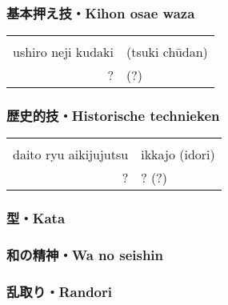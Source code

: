 \subsubsection{基本押え技・Kihon osae waza}
\begin{table}[H]
\begin{center}
\begin{tabular}{rl}
    \ruby{}{}\ruby{}{} & \\
    ushiro neji kudaki & (tsuki ch\={u}dan)\\
    ? & (?)
\end{tabular}
\end{center}
\label{kyuu_3_kihon_osae_waza}
\end{table}

\subsubsection{歴史的技・Historische technieken}
\begin{table}[H]
\begin{center}
\begin{tabular}{rl}
    \ruby{}{}\ruby{}{} & \\
    daito ryu aikijujutsu & ikkajo (idori)\\
    ? & ? (?)
\end{tabular}
\end{center}
\label{kyuu_3_historic}
\end{table}

\subsubsection{型・Kata}
\subsubsection{和の精神・Wa no seishin}
\subsubsection{乱取り・Randori}
